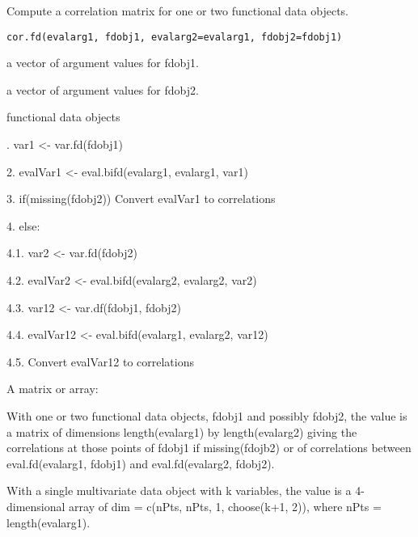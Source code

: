 \documentclass{article}
\begin{document}
\begin{Description}\relax
Compute a correlation matrix for one or two functional data objects.
\end{Description}
\begin{Usage}
\begin{verbatim}
cor.fd(evalarg1, fdobj1, evalarg2=evalarg1, fdobj2=fdobj1)
\end{verbatim}
\end{Usage}
\begin{Arguments}
\begin{ldescription}
\item[\code{evalarg1}] a vector of argument values for fdobj1.   

\item[\code{evalarg2}] a vector of argument values for fdobj2.  

\item[\code{fdobj1, fdobj2}] functional data objects 

\end{ldescription}
\end{Arguments}
\begin{Details}.  var1 <- var.fd(fdobj1) 

2.  evalVar1 <- eval.bifd(evalarg1, evalarg1, var1)


3.  if(missing(fdobj2)) Convert evalVar1 to correlations


4.  else:  

4.1.  var2 <- var.fd(fdobj2)

4.2.  evalVar2 <- eval.bifd(evalarg2, evalarg2, var2)

4.3.  var12 <- var.df(fdobj1, fdobj2)

4.4.  evalVar12 <- eval.bifd(evalarg1, evalarg2, var12)

4.5.  Convert evalVar12 to correlations
\end{Details}
\begin{Value}
A matrix or array:

With one or two functional data objects, fdobj1 and possibly fdobj2,
the value is a matrix of dimensions length(evalarg1) by length(evalarg2) giving the
correlations at those points of fdobj1 if missing(fdojb2) or of
correlations between eval.fd(evalarg1, fdobj1) and eval.fd(evalarg2,
fdobj2).

With a single multivariate data object with k variables, the value is
a 4-dimensional array of dim = c(nPts, nPts, 1, choose(k+1, 2)), where
nPts = length(evalarg1).
\end{Value}
\end{document}

